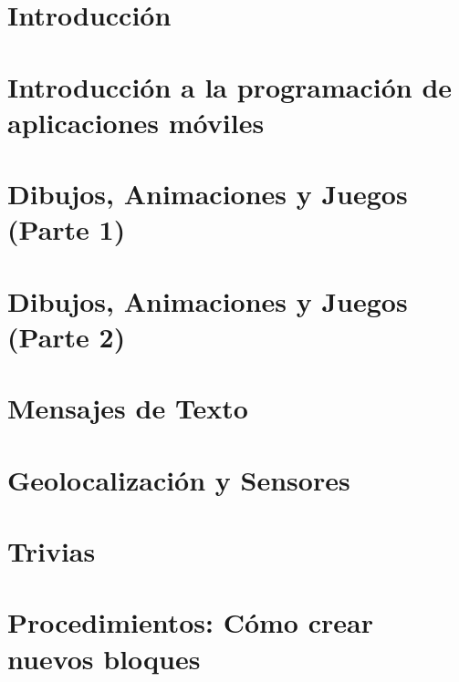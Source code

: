 \documentclass[letterpaper,12pt]{book}
\begin{document}

\tableofcontents %
\listoffigures   %
\cleardoublepage
\listoftables    %
\cleardoublepage

\setcounter{page}{1} %
\chapter*{Introducción}

\newpage
\chapter{Introducción a la programación de aplicaciones móviles}

\newpage
\chapter{Dibujos, Animaciones y Juegos (Parte 1)}

\newpage
\chapter{Dibujos, Animaciones y Juegos (Parte 2)}

\newpage
\chapter{Mensajes de Texto}

\newpage
\chapter{Geolocalización y Sensores}

\newpage
\chapter{Trivias}

\newpage
\chapter{Procedimientos: Cómo crear nuevos bloques}


%
\end{document}
